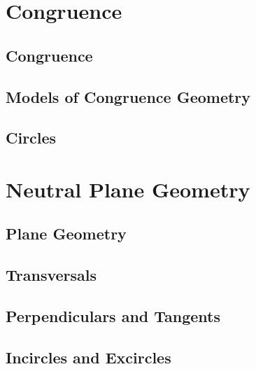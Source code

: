 \documentclass{memoir}
\begin{document}
\chapter{Congruence}
\newpage

  \section{Congruence}
    
    \newpage

  \section{Models of Congruence Geometry}
    
    \newpage

  \section{Circles}
    
    \newpage

\chapter{Neutral Plane Geometry}
\newpage

  \section{Plane Geometry}
    
    \newpage

  \section{Transversals}
    
    \newpage

  \section{Perpendiculars and Tangents}
    
    \newpage

  \section{Incircles and Excircles}
    

\backmatter
  \printindex
\end{document}
